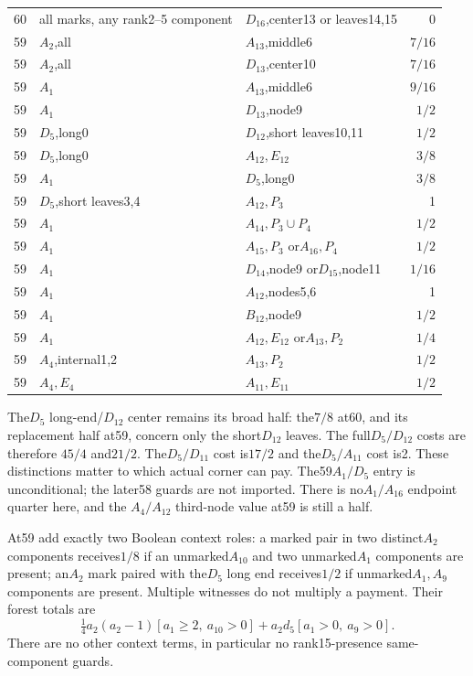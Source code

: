 \documentclass[11pt]{article}
\theoremstyle{remark}\newtheorem{remark}[theorem]{Remark}
\begin{document}
{\begin{longtable}{r p{}p{}r}
60&all marks, any rank2--5 component&$D_{16}$,center13 or leaves14,15&0\\
59&$A_2$,all&$A_{13}$,middle6&$7/16$\\
59&$A_2$,all&$D_{13}$,center10&$7/16$\\
59&$A_1$&$A_{13}$,middle6&$9/16$\\
59&$A_1$&$D_{13}$,node9&$1/2$\\
59&$D_5$,long0&$D_{12}$,short leaves10,11&$1/2$\\
59&$D_5$,long0&$A_{12},E_{12}$&$3/8$\\
59&$A_1$&$D_5$,long0&$3/8$\\
59&$D_5$,short leaves3,4&$A_{12},P_3$&1\\
59&$A_1$&$A_{14},P_3\cup P_4$&$1/2$\\
59&$A_1$&$A_{15},P_3$ or$A_{16},P_4$&$1/2$\\
59&$A_1$&$D_{14}$,node9 or$D_{15}$,node11&$1/16$\\
59&$A_1$&$A_{12}$,nodes5,6&1\\
59&$A_1$&$B_{12}$,node9&$1/2$\\
59&$A_1$&$A_{12},E_{12}$ or$A_{13},P_2$&$1/4$\\
59&$A_4$,internal1,2&$A_{13},P_2$&$1/2$\\
59&$A_4,E_4$&$A_{11},E_{11}$&$1/2$\\
\bottomrule
\end{longtable}
}
The$D_5$ long-end/$D_{12}$ center remains its broad half:
the$7/8$ at60, and its replacement half at59, concern only the
short$D_{12}$ leaves. The full$D_5/D_{12}$ costs are therefore
$45/4$ and$21/2$. The$D_5/D_{11}$ cost is$17/2$ and the$D_5/A_{11}$
cost is2. These distinctions matter to which actual corner can pay.
The59$A_1/D_5$ entry is unconditional; the later58 guards are not
imported. There is no$A_1/A_{16}$ endpoint quarter here, and the
$A_4/A_{12}$ third-node value at59 is still a half.

At59 add exactly two Boolean context roles: a marked pair in two
distinct$A_2$ components receives$1/8$ if an unmarked$A_{10}$ and
two unmarked$A_1$ components are present; an$A_2$ mark paired with
the$D_5$ long end receives$1/2$ if unmarked$A_1,A_9$ components
are present. Multiple witnesses do not multiply a payment. Their
forest totals are
\[
 \tfrac14a_2(a_2-1)[a_1\ge2,\ a_{10}>0]
       +a_2d_5[a_1>0,\ a_9>0].
\]
There are no other context terms, in particular no rank15-presence
same-component guards.
\end{document}
